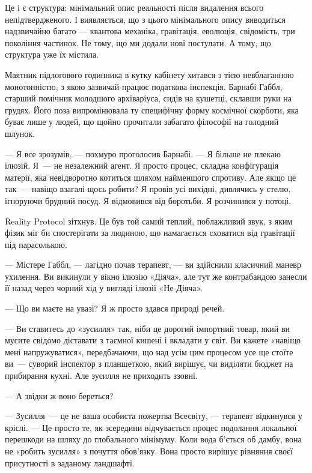 \documentclass[12pt, a4paper, openany]{book}
\begin{document}
Це і є структура: мінімальний опис реальності після видалення всього непідтвердженого. І виявляється, що з цього мінімального опису виводиться надзвичайно багато --- квантова механіка, гравітація, еволюція, свідомість, три покоління частинок. Не тому, що ми додали нові постулати. А тому, що структура уже їх містила.


\begin{realitybox}
Маятник підлогового годинника в кутку кабінету хитався з тією невблаганною монотонністю, з якою зазвичай працює податкова інспекція. Барнабі Габбл, старший помічник молодшого архіваріуса, сидів на кушетці, склавши руки на грудях. Його поза випромінювала ту специфічну форму космічної скорботи, яка буває лише у людей, що щойно прочитали забагато філософії на голодний шлунок.

--- Я все зрозумів, --- похмуро проголосив Барнабі. --- Я більше не плекаю ілюзій. Я~--- не незалежний агент. Я просто процес, складна конфігурація матерії, яка невідворотно котиться шляхом найменшого спротиву. Але якщо це так~--- навіщо взагалі щось робити? Я провів усі вихідні, дивлячись у стелю, ігноруючи брудний посуд. Я відмовився від боротьби. Я розчинився у потоці.

\medskip
Reality Protocol зітхнув. Це був той самий теплий, поблажливий звук, з яким фізик міг би спостерігати за людиною, що намагається сховатися від гравітації під парасолькою.

--- Містере Габбл, --- лагідно почав терапевт, --- ви здійснили класичний маневр ухилення. Ви викинули у вікно ілюзію «Діяча», але тут же контрабандою занесли її назад через чорний хід у вигляді ілюзії «Не-Діяча».

--- Що ви маєте на увазі? Я ж просто здався природі речей.

--- Ви ставитесь до «зусилля» так, ніби це дорогий імпортний товар, який ви мусите свідомо діставати з таємної кишені і вкладати у світ. Ви кажете «навіщо мені напружуватися», передбачаючи, що над усім цим процесом усе ще стоїте ви~--- суворий інспектор з планшеткою, який вирішує, чи виділяти бюджет на прибирання кухні. Але зусилля не приходить ззовні.

--- А звідки ж воно береться?

--- Зусилля~--- це не ваша особиста пожертва Всесвіту, --- терапевт відкинувся у кріслі. --- Це просто те, як зсередини відчувається процес подолання локальної перешкоди на шляху до глобального мінімуму. Коли вода б'ється об дамбу, вона не «робить зусилля» з почуття обов'язку. Вона просто вирішує рівняння своєї присутності в заданому ландшафті.


\end{realitybox}
\end{document}
